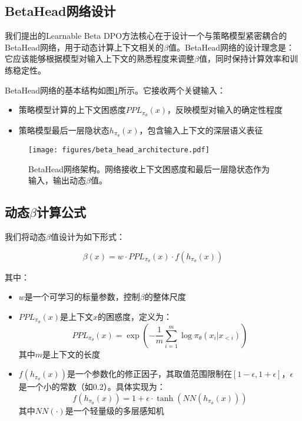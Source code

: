 \subsection{BetaHead网络设计}
我们提出的Learnable Beta DPO方法核心在于设计一个与策略模型紧密耦合的BetaHead网络，用于动态计算上下文相关的$\beta$值。BetaHead网络的设计理念是：它应该能够根据模型对输入上下文的熟悉程度来调整$\beta$值，同时保持计算效率和训练稳定性。

BetaHead网络的基本结构如图\ref{fig:beta_head}所示。它接收两个关键输入：

\begin{itemize}
    \item 策略模型计算的上下文困惑度$PPL_{\pi_\theta}(x)$，反映模型对输入的确定性程度
    \item 策略模型最后一层隐状态$h_{\pi_\theta}(x)$，包含输入上下文的深层语义表征
\end{itemize}

\begin{figure}[h]
    \centering
    \texttt{[image: figures/beta\_head\_architecture.pdf]}
    \caption{BetaHead网络架构。网络接收上下文困惑度和最后一层隐状态作为输入，输出动态$\beta$值。}
    \label{fig:beta_head}
\end{figure}

\subsection{动态$\beta$计算公式}
我们将动态$\beta$值设计为如下形式：

\begin{equation}
\beta(x) = w \cdot PPL_{\pi_\theta}(x) \cdot f(h_{\pi_\theta}(x))
\end{equation}

其中：
\begin{itemize}
    \item $w$是一个可学习的标量参数，控制$\beta$的整体尺度
    \item $PPL_{\pi_\theta}(x)$是上下文$x$的困惑度，定义为：
    \begin{equation}
    PPL_{\pi_\theta}(x) = \exp \left( - \frac{1}{m} \sum_{i=1}^m \log \pi_\theta(x_i | x_{<i}) \right)
    \end{equation}
    其中$m$是上下文的长度
    \item $f(h_{\pi_\theta}(x))$是一个参数化的修正因子，其取值范围限制在$[1-\epsilon, 1+\epsilon]$，$\epsilon$是一个小的常数（如0.2）。具体实现为：
    \begin{equation}
    f(h_{\pi_\theta}(x)) = 1 + \epsilon \cdot \tanh(NN(h_{\pi_\theta}(x)))
    \end{equation}
    其中$NN(\cdot)$是一个轻量级的多层感知机
\end{itemize}

